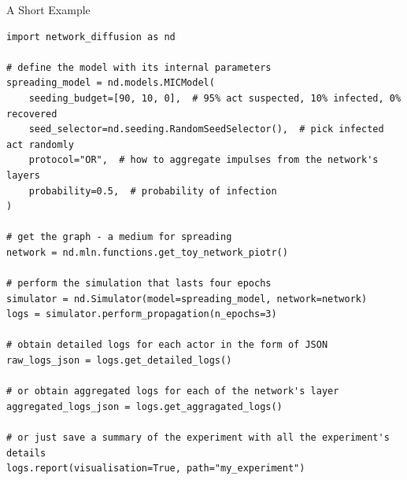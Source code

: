 \documentclass[final]{beamer}
\newlength{\colwidth}
\begin{document}
\begin{frame}[t, fragile]
\begin{columns}[t]
\begin{column}{\colwidth}



\begin{alertblock}{A Short Example}
\begin{lstlisting}[style=py, basicstyle=\footnotesize\ttfamily]
import network_diffusion as nd

# define the model with its internal parameters
spreading_model = nd.models.MICModel(
    seeding_budget=[90, 10, 0],  # 95% act suspected, 10% infected, 0% recovered
    seed_selector=nd.seeding.RandomSeedSelector(),  # pick infected act randomly
    protocol="OR",  # how to aggregate impulses from the network's layers
    probability=0.5,  # probability of infection
)

# get the graph - a medium for spreading
network = nd.mln.functions.get_toy_network_piotr()

# perform the simulation that lasts four epochs
simulator = nd.Simulator(model=spreading_model, network=network)
logs = simulator.perform_propagation(n_epochs=3)

# obtain detailed logs for each actor in the form of JSON
raw_logs_json = logs.get_detailed_logs()

# or obtain aggregated logs for each of the network's layer
aggregated_logs_json = logs.get_aggragated_logs()

# or just save a summary of the experiment with all the experiment's details
logs.report(visualisation=True, path="my_experiment")
\end{lstlisting}
\end{alertblock}
    


\end{column}
\end{columns}
\end{frame}
\end{document}
